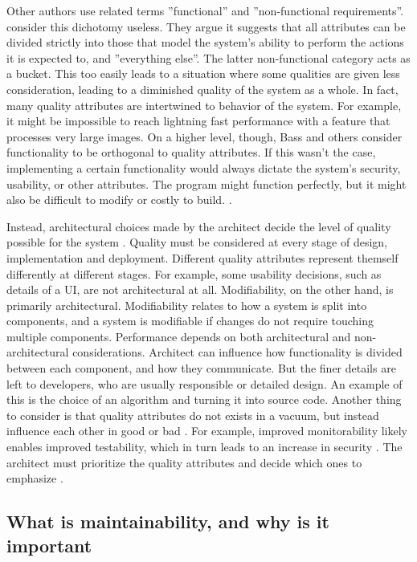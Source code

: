 \documentclass[utf8,english]{gradu3}
\begin{document}
Other authors use related terms ''functional'' and ''non-functional
requirements''. \textcite[76]{Bass1998} consider this dichotomy useless. They argue it
suggests that all attributes can be divided strictly into those that model the
system's ability to perform the actions it is expected to, and ''everything
else''. The latter non-functional category acts as a bucket. This too easily
leads to a situation where some qualities are given less consideration, leading
to a diminished quality of the system as a whole. In fact, many quality
attributes are intertwined to behavior of the system. For example, it might be
impossible to reach lightning fast performance with a feature that processes
very large images. On a higher level, though, Bass and others consider
functionality to be orthogonal to quality attributes. If this wasn't the case,
implementing a certain functionality would always dictate the system's security,
usability, or other attributes. The program might function perfectly, but it
might also be difficult to modify or costly to build. \parencite[77]{Bass1998}.

Instead, architectural choices made by the architect decide the level of quality
possible for the system \parencite[72]{Bass2003}. Quality must be considered at
every stage of design, implementation and deployment.
Different quality attributes represent themself differently at different stages.
For example, some usability decisions, such as details of a UI, are not
architectural at all. Modifiability, on the other hand, is primarily
architectural. Modifiability relates to how a system is split into components,
and a system is modifiable if changes do not require touching multiple
components. Performance depends on both architectural and non-architectural
considerations. Architect can influence how functionality is divided between
each component, and how they communicate. But the finer details are left to
developers, who are usually responsible or detailed design. An example of this
is the choice of an algorithm and turning it into source code. Another thing to
consider is that quality attributes do not exists in a vacuum, but instead
influence each other in good or bad \parencite[78]{Bass1998}. For example,
improved monitorability likely enables improved testability, which in turn leads
to an increase in security \parencite[18]{Li2021}. The architect must prioritize the
quality attributes and decide which ones to emphasize \parencite[129]{Bass1998}.


\subsection{What is maintainability, and why is it important}
\end{document}
